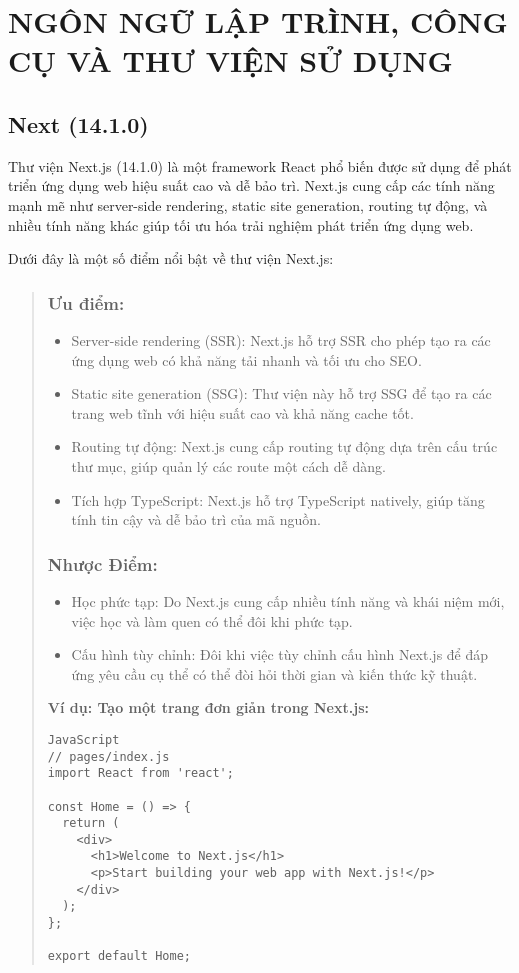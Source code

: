  

  

  
 


\section{NGÔN NGỮ LẬP TRÌNH, CÔNG CỤ VÀ THƯ VIỆN SỬ DỤNG}

\subsection{Next (14.1.0)}
Thư viện Next.js (14.1.0) là một framework React phổ biến được sử dụng để phát triển ứng dụng web hiệu suất cao và dễ bảo trì. Next.js cung cấp các tính năng mạnh mẽ như server-side rendering, static site generation, routing tự động, và nhiều tính năng khác giúp tối ưu hóa trải nghiệm phát triển ứng dụng web.

Dưới đây là một số điểm nổi bật về thư viện Next.js:

\begin{quote}
\subsubsection{Ưu điểm:}
\begin{itemize}
  \item Server-side rendering (SSR): Next.js hỗ trợ SSR cho phép tạo ra các ứng dụng web có khả năng tải nhanh và tối ưu cho SEO.
  \item Static site generation (SSG): Thư viện này hỗ trợ SSG để tạo ra các trang web tĩnh với hiệu suất cao và khả năng cache tốt.
  \item Routing tự động: Next.js cung cấp routing tự động dựa trên cấu trúc thư mục, giúp quản lý các route một cách dễ dàng.
  \item Tích hợp TypeScript: Next.js hỗ trợ TypeScript natively, giúp tăng tính tin cậy và dễ bảo trì của mã nguồn.
\end{itemize}

\subsubsection{Nhược Điểm:}
\begin{itemize}
  \item Học phức tạp: Do Next.js cung cấp nhiều tính năng và khái niệm mới, việc học và làm quen có thể đôi khi phức tạp.
  \item Cấu hình tùy chỉnh: Đôi khi việc tùy chỉnh cấu hình Next.js để đáp ứng yêu cầu cụ thể có thể đòi hỏi thời gian và kiến thức kỹ thuật.
\end{itemize}

\textbf{Ví dụ: Tạo một trang đơn giản trong Next.js:}
\begin{lstlisting}
JavaScript
// pages/index.js
import React from 'react';

const Home = () => {
  return (
    <div>
      <h1>Welcome to Next.js</h1>
      <p>Start building your web app with Next.js!</p>
    </div>
  );
};

export default Home;
\end{lstlisting}
\end{quote}


